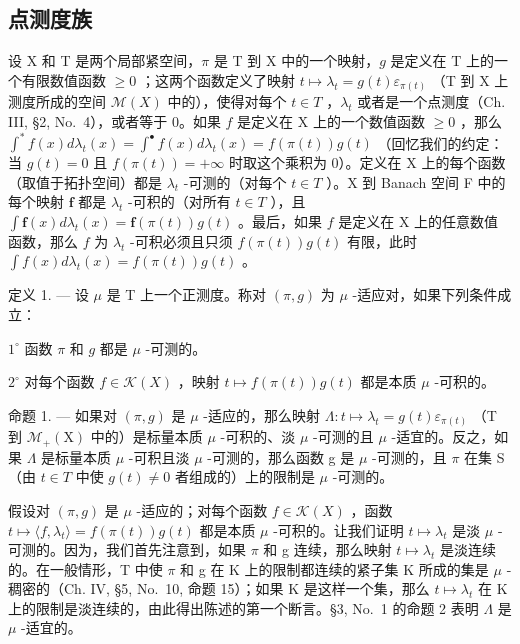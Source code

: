 \subsection{点测度族}

设 X 和 T 是两个局部紧空间，\(\pi\) 是 T 到 X 中的一个映射，\(g\) 是定义在 T 上的一个有限数值函数 \(\geqslant 0\) ；这两个函数定义了映射 \(t \mapsto \lambda_t = g(t)\varepsilon_{\pi(t)}\) （T 到 X 上测度所成的空间 \(\mathcal{M}(X)\) 中的），使得对每个 \(t \in T\) ，\(\lambda_t\) 或者是一个点测度（Ch. III, §2, No.~4），或者等于 0。如果 \(f\) 是定义在 X 上的一个数值函数 \(\geqslant 0\) ，那么 \(\int^{*} f(x) d\lambda_t(x) = \int^{\bullet} f(x) d\lambda_t(x) = f(\pi(t))g(t)\) （回忆我们的约定：当 \(g(t) = 0\) 且 \(f(\pi(t)) = +\infty\) 时取这个乘积为 0）。定义在 X 上的每个函数（取值于拓扑空间）都是 \(\lambda_t\) -可测的（对每个 \(t \in T\) ）。X 到 Banach 空间 F 中的每个映射 \(\mathbf{f}\) 都是 \(\lambda_t\) -可积的（对所有 \(t \in T\) ），且 \(\int \mathbf{f}(x) d\lambda_t(x) = \mathbf{f}(\pi(t))g(t)\) 。最后，如果 \(f\) 是定义在 X 上的任意数值函数，那么 \(f\) 为 \(\lambda_t\) -可积必须且只须 \(f(\pi(t))g(t)\) 有限，此时 \(\int f(x) d\lambda_t(x) = f(\pi(t))g(t)\) 。

定义 1. --- 设 \(\mu\) 是 T 上一个正测度。称对 \((\pi, g)\) 为 \(\mu\) -适应对，如果下列条件成立：

\(1^{\circ}\) 函数 \(\pi\) 和 \(g\) 都是 \(\mu\) -可测的。

\(2^{\circ}\) 对每个函数 \(f \in \mathcal{K}(X)\) ，映射 \(t \mapsto f(\pi(t))g(t)\) 都是本质 \(\mu\) -可积的。

命题 1. --- 如果对 \((\pi, g)\) 是 \(\mu\) -适应的，那么映射 \(\Lambda: t \mapsto \lambda_t = g(t) \varepsilon_{\pi(t)}\) （T 到 \(\mathcal{M}_+(\mathrm{X})\) 中的）是标量本质 \(\mu\) -可积的、淡 \(\mu\) -可测的且 \(\mu\) -适宜的。反之，如果 \(\Lambda\) 是标量本质 \(\mu\) -可积且淡 \(\mu\) -可测的，那么函数 g 是 \(\mu\) -可测的，且 \(\pi\) 在集 S（由 \(t \in T\) 中使 \(g(t) \neq 0\) 者组成的）上的限制是 \(\mu\) -可测的。

假设对 \((\pi,g)\) 是 \(\mu\) -适应的；对每个函数 \(f \in \mathcal{K}(X)\) ，函数 \(t \mapsto \langle f, \lambda_t \rangle = f(\pi(t))g(t)\) 都是本质 \(\mu\) -可积的。让我们证明 \(t \mapsto \lambda_t\) 是淡 \(\mu\) -可测的。因为，我们首先注意到，如果 \(\pi\) 和 g 连续，那么映射 \(t \mapsto \lambda_t\) 是淡连续的。在一般情形，T 中使 \(\pi\) 和 g 在 K 上的限制都连续的紧子集 K 所成的集是 \(\mu\) -稠密的（Ch. IV, §5, No.~10, 命题 15）；如果 K 是这样一个集，那么 \(t \mapsto \lambda_t\) 在 K 上的限制是淡连续的，由此得出陈述的第一个断言。§3, No.~1 的命题 2 表明 \(\Lambda\) 是 \(\mu\) -适宜的。

